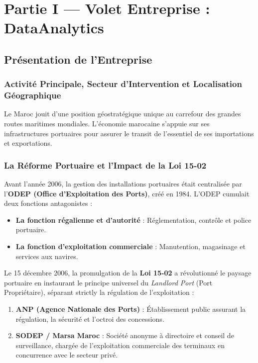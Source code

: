 \documentclass[12pt,a4paper,oneside]{report}
\begin{document}
\newpage

\chapter{Partie I — Volet Entreprise : DataAnalytics}

\section{Présentation de l'Entreprise}

\subsection{Activité Principale, Secteur d'Intervention et Localisation Géographique}
Le Maroc jouit d'une position géostratégique unique au carrefour des grandes routes maritimes mondiales. L'économie marocaine s'appuie sur ses infrastructures portuaires pour assurer le transit de l'essentiel de ses importations et exportations. 

\subsection{La Réforme Portuaire et l'Impact de la Loi 15-02}
Avant l'année 2006, la gestion des installations portuaires était centralisée par l'\textbf{ODEP (Office d'Exploitation des Ports)}, créé en 1984. L'ODEP cumulait deux fonctions antagonistes :
\begin{itemize}
    \item \textbf{La fonction régalienne et d'autorité} : Réglementation, contrôle et police portuaire.
    \item \textbf{La fonction d'exploitation commerciale} : Manutention, magasinage et services aux navires.
\end{itemize}

Le 15 décembre 2006, la promulgation de la \textbf{Loi 15-02} a révolutionné le paysage portuaire en instaurant le principe universel du \textit{Landlord Port} (Port Propriétaire), séparant strictly la régulation de l'exploitation :
\begin{enumerate}
    \item \textbf{ANP (Agence Nationale des Ports)} : Établissement public assurant la régulation, la sécurité et l'octroi des concessions.
    \item \textbf{SODEP / Marsa Maroc} : Société anonyme à directoire et conseil de surveillance, chargée de l'exploitation commerciale des terminaux en concurrence avec le secteur privé.
\end{enumerate}
\end{document}
